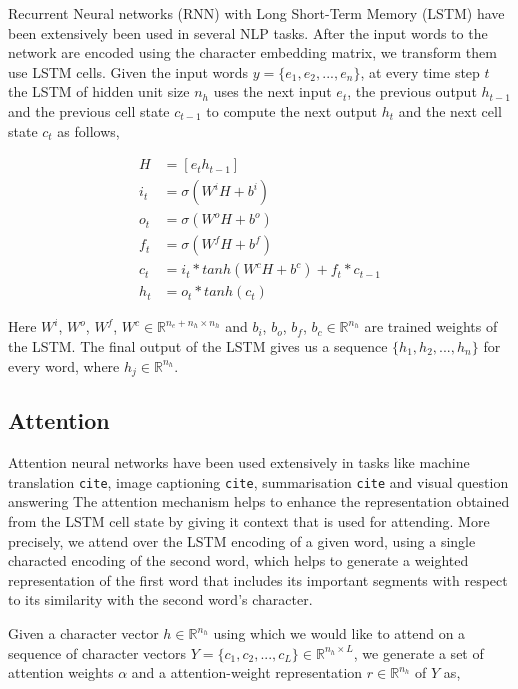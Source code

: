 \documentclass[11pt,letterpaper]{article}
\begin{document}
Recurrent Neural networks (RNN) with Long Short-Term Memory (LSTM) have been extensively been used in several NLP tasks. After the input words to the network are encoded using the character embedding matrix, we transform them use LSTM cells. Given the input words $y = \{e_1, e_2, ..., e_n\}$, at every time step $t$ the LSTM of hidden unit size $n_h$ uses the next input $e_t$, the previous output $h_{t-1}$ and the previous cell state $c_{t-1}$ to compute the next output $h_t$ and the next cell state $c_t$ as follows,

\begin{align}
H &= [e_t h_{t-1}] \\
i_t &= \sigma (W^iH + b^i) \\
o_t &= \sigma (W^oH + b^o) \\
f_t &= \sigma (W^fH + b^f) \\
c_t &= i_t * tanh(W^cH + b^c) + f_t * c_{t-1} \\
h_t &= o_t * tanh(c_t)
\end{align}

Here $W^i$, $W^o$, $W^f$, $W^c \in  \mathbb{R}^{n_e+n_h \times n_h}$ and $b_i$, $b_o$, $b_f$, $b_c \in \mathbb{R}^{n_h}$ are trained weights of the LSTM. The final output of the LSTM gives us a sequence $\{h_1, h_2, ..., h_n\}$ for every word, where $h_j \in \mathbb{R}^{n_h}$.

\subsection{Attention}

Attention neural networks have been used extensively in tasks like machine translation \texttt{cite}, image captioning \texttt{cite}, summarisation \texttt{cite} and visual question answering %
The attention mechanism helps to enhance the representation obtained from the LSTM cell state by giving it context that is used for attending. More precisely, we attend over the LSTM encoding of a given word, using a single characted encoding of the second word, which helps to generate a weighted representation of the first word that includes its important segments with respect to its similarity with the second word's character. 

Given a character vector $h \in  \mathbb{R}^{n_h}$ using which we would like to attend on a sequence of character vectors $Y = \{c_1, c_2, ..., c_L\} \in \mathbb{R}^{n_h \times L}$, we generate a set of attention weights $\alpha$ and a attention-weight representation $r \in  \mathbb{R}^{n_h}$ of $Y$ as,
\end{document}
